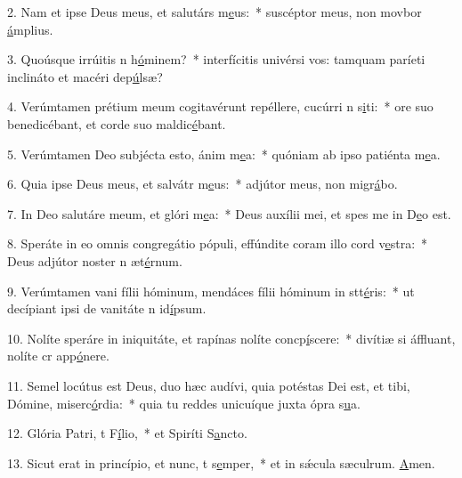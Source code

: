2. Nam et ipse Deus meus, et salutárs m\uline{e}us:~* suscéptor meus, non movbor \uline{á}mplius.\par 
3. Quoúsque irrúitis n h\uline{ó}minem?~* interfícitis univérsi vos: tamquam paríeti inclináto et macéri dep\uline{ú}lsæ?\par 
4. Verúmtamen prétium meum cogitavérunt repéllere, cucúrri n s\uline{i}ti:~* ore suo benedicébant, et corde suo maldic\uline{é}bant.\par 
5. Verúmtamen Deo subjécta esto, ánim m\uline{e}a:~* quóniam ab ipso patiénta m\uline{e}a.\par 
6. Quia ipse Deus meus, et salvátr m\uline{e}us:~* adjútor meus, non migr\uline{á}bo.\par 
7. In Deo salutáre meum, et glóri m\uline{e}a:~* Deus auxílii mei, et spes me in D\uline{e}o est.\par 
8. Speráte in eo omnis congregátio pópuli, effúndite coram illo cord v\uline{e}stra:~* Deus adjútor noster n æt\uline{é}rnum.\par 
9. Verúmtamen vani fílii hóminum, mendáces fílii hóminum in stt\uline{é}ris:~* ut decípiant ipsi de vanitáte n id\uline{í}psum.\par 
10. Nolíte speráre in iniquitáte, et rapínas nolíte concp\uline{í}scere:~* divítiæ si áffluant, nolíte cr app\uline{ó}nere.\par 
11. Semel locútus est Deus, duo hæc audívi, quia potéstas Dei est, et tibi, Dómine, miserc\uline{ó}rdia:~* quia tu reddes unicuíque juxta ópra s\uline{u}a.\par 
12. Glória Patri, t F\uline{í}lio,~* et Spiríti S\uline{a}ncto.\par 
13. Sicut erat in princípio, et nunc, t s\uline{e}mper,~* et in sǽcula sæculrum. \uline{A}men.\par 
